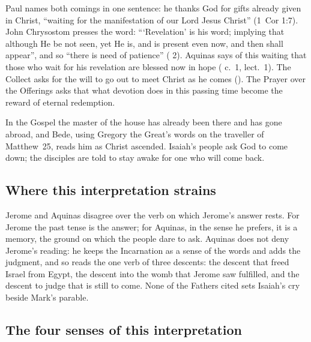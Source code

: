 Paul names both comings in one sentence: he thanks God for gifts already
given in Christ, ``waiting for the manifestation of our Lord Jesus Christ''
(1~Cor 1:7). John Chrysostom presses the word: ```Revelation' is his word;
implying that although He be not seen, yet He is, and is present even now,
and then shall appear'', and so ``there is need of patience''
( 2). Aquinas says of this waiting that
those who wait for his revelation are blessed now in hope ( c.~1, lect.~1). The Collect asks for the will to go out to meet
Christ as he comes (). The Prayer over the Offerings
asks that what devotion does in this passing time become the reward of
eternal redemption.

In the Gospel the master of the house has already been there and has gone
abroad, and Bede, using Gregory the Great's words on the traveller of
Matthew~25, reads him as Christ ascended. Isaiah's people ask God to come
down; the disciples are told to stay awake for one who will come back.

\subsection{Where this interpretation strains}

Jerome and Aquinas disagree over the verb on which Jerome's answer rests. For
Jerome the past tense is the answer; for Aquinas, in the sense he prefers, it
is a memory, the ground on which the people dare to ask. Aquinas does not
deny Jerome's reading: he keeps the Incarnation as a sense of the words and
adds the judgment, and so reads the one verb of three descents: the descent
that freed Israel from Egypt, the descent into the womb that Jerome saw
fulfilled, and the descent to judge that is still to come. None of the
Fathers cited sets Isaiah's cry beside Mark's parable.

\subsection{The four senses of this interpretation}

